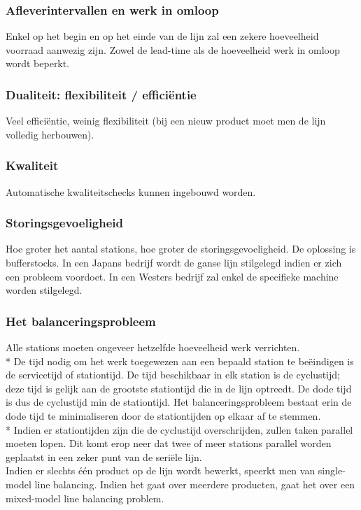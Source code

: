 \documentclass[12pt]{article}
\begin{document}
\subsubsection{Afleverintervallen en werk in omloop}
Enkel op het begin en op het einde van de lijn zal een zekere hoeveelheid voorraad aanwezig zijn. Zowel de lead-time als de hoeveelheid werk in omloop wordt beperkt.
\subsubsection{Dualiteit: flexibiliteit / effici\"entie}
Veel effici\"entie, weinig flexibiliteit (bij een nieuw product moet men de lijn volledig herbouwen).
\subsubsection{Kwaliteit}
Automatische kwaliteitschecks kunnen ingebouwd worden.
\subsubsection{Storingsgevoeligheid}
Hoe groter het aantal stations, hoe groter de storingsgevoeligheid. De oplossing is bufferstocks. In een Japans bedrijf wordt de ganse lijn stilgelegd indien er zich een probleem voordoet. In een Westers bedrijf zal enkel de specifieke machine worden stilgelegd.
\subsubsection{Het balanceringsprobleem}
Alle stations moeten ongeveer hetzelfde hoeveelheid werk verrichten.\\*
De tijd nodig om het werk toegewezen aan een bepaald station te be\"eindigen is de servicetijd of stationtijd. De tijd beschikbaar in elk station is de cyclustijd; deze tijd is gelijk aan de grootste stationtijd die in de lijn optreedt. De dode tijd is dus de cyclustijd min de stationtijd. Het balanceringsprobleem bestaat erin de dode tijd te minimaliseren door de stationtijden op elkaar af te stemmen.\\*
Indien er stationtijden zijn die de cyclustijd overschrijden, zullen taken parallel moeten lopen. Dit komt erop neer dat twee of meer stations parallel worden geplaatst in een zeker punt van de seri\"ele lijn.\\
Indien er slechts \'e\'en product op de lijn wordt bewerkt, speerkt men van single-model line balancing. Indien het gaat over meerdere producten, gaat het over een mixed-model line balancing problem.
\end{document}
